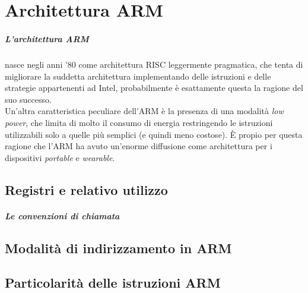 \documentclass[class=book, crop=false]{standalone}
\begin{document}
\chapter{Architettura ARM}
\paragraph{L'architettura ARM} nasce negli anni '80 come architettura RISC leggermente pragmatica, che tenta di migliorare la suddetta architettura implementando delle istruzioni e delle strategie appartenenti ad Intel, probabilmente è esattamente questa la ragione del suo successo.\\
Un'altra caratteristica peculiare dell'ARM è la presenza di una modalità \emph{low power}, che limita di molto il consumo di energia restringendo le istruzioni utilizzabili solo a quelle più semplici (e quindi meno costose). È propio per questa ragione che l'ARM ha avuto un'enorme diffusione come architettura per i dispositivi \emph{portable} e \emph{wearable}.

\section{Registri e relativo utilizzo}

\paragraph{Le convenzioni di chiamata}

\section{Modalità di indirizzamento in ARM}

\section{Particolarità delle istruzioni ARM}	 
\end{document}
